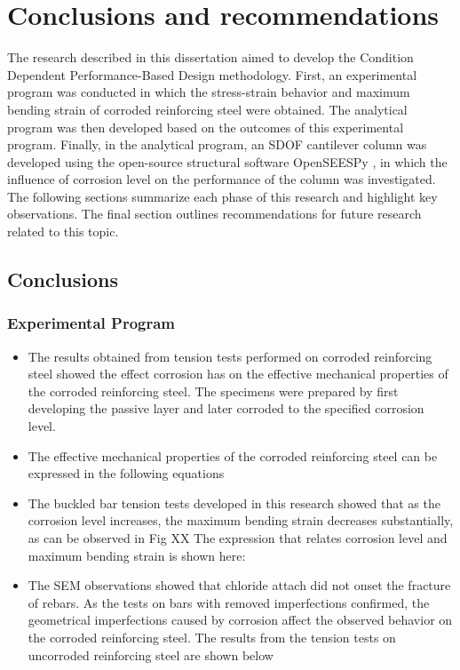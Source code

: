 \chapter{Conclusions and recommendations}

\label{chap-seven}

The research described in this dissertation aimed to develop the Condition Dependent Performance-Based Design methodology. First, an experimental program was conducted in which the stress-strain behavior and maximum bending strain of corroded reinforcing steel were obtained. The analytical program was then developed based on the outcomes of this experimental program. Finally, in the analytical program, an SDOF cantilever column was developed using the open-source structural software OpenSEESPy \cite{Zhu2018}, in which the influence of corrosion level on the performance of the column was investigated. The following sections summarize each phase of this research and highlight key observations. The final section outlines recommendations for future research related to this topic.

\section{Conclusions}
\subsection{Experimental Program}
\begin{itemize}
    \item The results obtained from tension tests performed on corroded reinforcing steel showed the effect corrosion has on the effective mechanical properties of the corroded reinforcing steel. The specimens were prepared by first developing the passive layer and later corroded to the specified corrosion level.
    \item The effective mechanical properties of the corroded reinforcing steel can be expressed in the following equations
    \item The buckled bar tension tests developed in this research showed that as the corrosion level increases, the maximum bending strain decreases substantially, as can be observed in Fig XX The expression that relates corrosion level and maximum bending strain is shown here:
    \item The SEM observations showed that chloride attach did not onset the fracture of rebars. As the tests on bars with removed imperfections confirmed, the geometrical imperfections caused by corrosion affect the observed behavior on the corroded reinforcing steel. The results from the tension tests on uncorroded reinforcing steel are shown below
\end{itemize}
